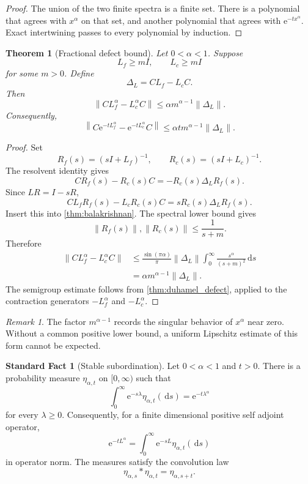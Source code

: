 \documentclass{aomart}
\newtheorem{theorem}{Theorem}[section]
\theoremstyle{definition}
\newtheorem{standardfact}[standardfact]{Standard Fact}
\theoremstyle{remark}
\newtheorem{remark}[remark]{Remark}
\newcommand{\e}{\mathrm e}
\newcommand{\dd}{\,\mathrm d}
\newcommand{\norm}[1]{\left\lVert#1\right\rVert}
\begin{document}
\begin{proof}
The union of the two finite spectra is a finite set. There is a polynomial that agrees with \(x^\alpha\) on that set, and another polynomial that agrees with \(\e^{-tx^\alpha}\). Exact intertwining passes to every polynomial by induction.
\end{proof}

\begin{theorem}[Fractional defect bound]\label{thm:fractional_defect}
Let \(0<\alpha<1\). Suppose
\[
L_f\geq mI,
\qquad
L_c\geq mI
\]
for some \(m>0\). Define
\[
\Delta_L=CL_f-L_cC.
\]
Then
\[
\norm{CL_f^\alpha-L_c^\alpha C}
\leq
\alpha m^{\alpha-1}\norm{\Delta_L}.
\]
Consequently,
\[
\norm{
C\e^{-tL_f^\alpha}
-
\e^{-tL_c^\alpha}C
}
\leq
\alpha t m^{\alpha-1}\norm{\Delta_L}.
\]
\end{theorem}

\begin{proof}
Set
\[
R_f(s)=(sI+L_f)^{-1},
\qquad
R_c(s)=(sI+L_c)^{-1}.
\]
The resolvent identity gives
\[
CR_f(s)-R_c(s)C
=
-R_c(s)\Delta_LR_f(s).
\]
Since \(LR=I-sR\),
\[
CL_fR_f(s)-L_cR_c(s)C
=
sR_c(s)\Delta_LR_f(s).
\]
Insert this into \cref{thm:balakrishnan}. The spectral lower bound gives
\[
\norm{R_f(s)},\norm{R_c(s)}
\leq
\frac{1}{s+m}.
\]
Therefore
\[
\begin{aligned}
\norm{CL_f^\alpha-L_c^\alpha C}
&\leq
\frac{\sin(\pi\alpha)}{\pi}
\norm{\Delta_L}
\int_0^\infty
\frac{s^\alpha}{(s+m)^2}\dd s\\
&=
\alpha m^{\alpha-1}\norm{\Delta_L}.
\end{aligned}
\]
The semigroup estimate follows from \cref{thm:duhamel_defect}, applied to the contraction generators \(-L_f^\alpha\) and \(-L_c^\alpha\).
\end{proof}

\begin{remark}
The factor \(m^{\alpha-1}\) records the singular behavior of \(x^\alpha\) near zero. Without a common positive lower bound, a uniform Lipschitz estimate of this form cannot be expected.
\end{remark}

\begin{standardfact}[Stable subordination]\label{fact:stable_subordination}
Let \(0<\alpha<1\) and \(t>0\). There is a probability measure \(\eta_{\alpha,t}\) on \([0,\infty)\) such that
\[
\int_0^\infty \e^{-s\lambda}\eta_{\alpha,t}(\dd s)
=
\e^{-t\lambda^\alpha}
\]
for every \(\lambda\geq0\). Consequently, for a finite dimensional positive self adjoint operator,
\[
\e^{-tL^\alpha}
=
\int_0^\infty
\e^{-sL}\eta_{\alpha,t}(\dd s)
\]
in operator norm. The measures satisfy the convolution law
\[
\eta_{\alpha,s}*\eta_{\alpha,t}
=
\eta_{\alpha,s+t}.
\]
\end{standardfact}
\end{document}
